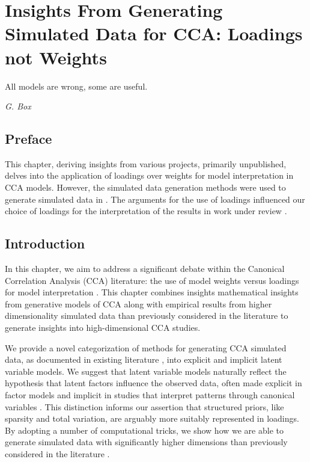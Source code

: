 \graphicspath{{chapters/loadings/}}


\chapter{Insights From Generating Simulated Data for CCA: Loadings not Weights}\label{ch:loadings}
\epigraph{All models are wrong, some are useful.}{\textit{G. Box}}
\minitoc
\section*{Preface}

This chapter, deriving insights from various projects, primarily unpublished, delves into the application of loadings over weights for model interpretation in CCA models.
However, the simulated data generation methods were used to generate simulated data in \citet{mihalik2022canonical}.
The arguments for the use of loadings influenced our choice of loadings for the interpretation of the results in work under review \citet{adams2023}.

\section{Introduction}

In this chapter, we aim to address a significant debate within the Canonical Correlation Analysis (CCA) literature: the use of model weights versus loadings for model interpretation \citep{gu2018simultaneous}.
This chapter combines insights mathematical insights from generative models of CCA along with empirical results from higher dimensionality simulated data than previously considered in the literature to generate insights into high-dimensional CCA studies.

We provide a novel categorization of methods for generating CCA simulated data, as documented in existing literature \citep{witten2009penalized,chen2013sparse, suo2017sparse, helmer2020stability}, into explicit and implicit latent variable models.
We suggest that latent variable models naturally reflect the hypothesis that latent factors influence the observed data, often made explicit in factor models \citep{ferreira2022hierarchical, cheng2013group} and implicit in studies that interpret patterns through canonical variables \citep{mihalik2019brain, mihalik2020multiple}.
This distinction informs our assertion that structured priors, like sparsity and total variation, are arguably more suitably represented in loadings.
By adopting a number of computational tricks, we show how we are able to generate simulated data with significantly higher dimensions than previously considered in the literature \citep{helmer2020stability, matkovivc2023static}.

